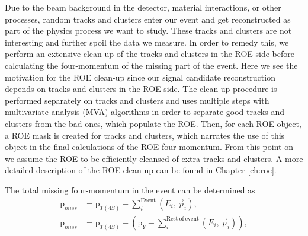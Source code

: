 Due to the beam background in the detector, material interactions, or other processes, random tracks and clusters enter our event and get reconstructed as part of the physics process we want to study. These tracks and clusters are not interesting and further spoil the data we measure. In order to remedy this, we perform an extensive clean-up of the tracks and clusters in the ROE side before calculating the four-momentum of the missing part of the event. Here we see the motivation for the ROE clean-up since our signal candidate reconstruction depends on tracks and clusters in the ROE side. The clean-up procedure is performed separately on tracks and clusters and uses multiple steps with multivariate analysis (MVA) algorithms in order to separate good tracks and clusters from the bad ones, which populate the ROE. Then, for each ROE object, a ROE mask is created for tracks and clusters, which narrates the use of this object in the final calculations of the ROE four-momentum. From this point on we assume the ROE to be efficiently cleansed of extra tracks and clusters. A more detailed description of the ROE clean-up can be found in Chapter \ref{ch:roe}. 

The total missing four-momentum in the event can be determined as
\begin{align}
\mathrm{p}_{miss} &= \mathrm{p}_{\Upsilon(4S)} - \sum_i^{\mathrm{Event}}\left(E_i,\,\vec{p}_i \right),\\
\label{eq:ROEloop}
\mathrm{p}_{miss} &= \mathrm{p}_{\Upsilon(4S)} - \left(\mathrm{p}_{Y} -\sum_i^{\mathrm{Rest~of~event}}\left(E_i,\,\vec{p}_i \right)\right),
\end{align}

